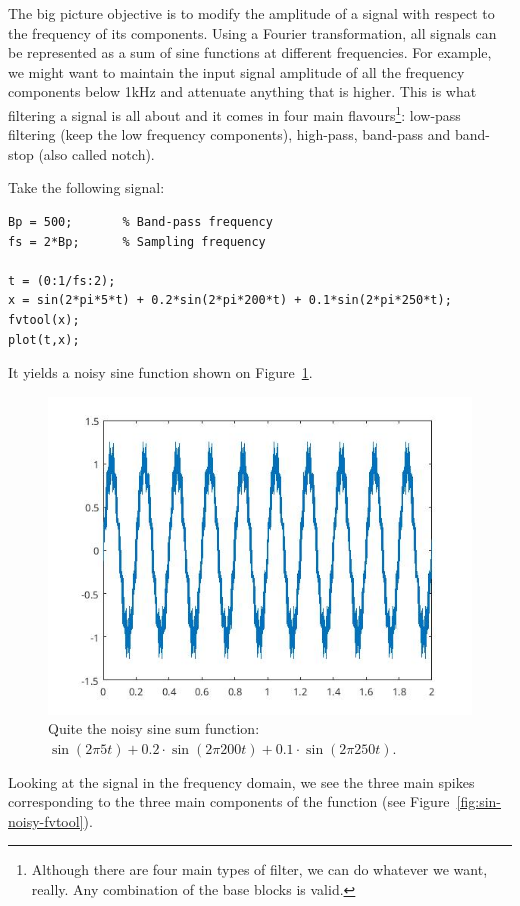 \documentclass{../template/labo}
\author{DLH}
\begin{document}

The big picture objective is to modify the amplitude of a signal with respect to the frequency of its components. Using a Fourier transformation, all signals can be represented as a sum of sine functions at different frequencies. 
For example, we might want to maintain the input signal amplitude of all the frequency components below 1kHz and attenuate anything that is higher.
This is what filtering a signal is all about and it comes in four main flavours\footnote{Although there are four main types of filter, we can do whatever we want, really. Any combination of the base blocks is valid.}: low-pass filtering (keep the low frequency components), high-pass, band-pass and band-stop (also called notch).

Take the following signal:
\begin{verbatim}
Bp = 500;       % Band-pass frequency
fs = 2*Bp;      % Sampling frequency

t = (0:1/fs:2);
x = sin(2*pi*5*t) + 0.2*sin(2*pi*200*t) + 0.1*sin(2*pi*250*t);
fvtool(x);
plot(t,x);
\end{verbatim}

It yields a noisy sine function shown on Figure~\ref{fig:sine-noisy}.

\begin{figure}[ht!]
\centering
\includegraphics[width=.6\textwidth]{sin-noisy.jpg}
\caption{Quite the noisy sine sum function: $\sin (2\pi 5t) + 0.2 \cdot \sin (2\pi 200t) +  0.1 \cdot \sin (2 \pi 250t)$.}
\label{fig:sine-noisy}
\end{figure}

Looking at the signal in the frequency domain, we see the three main spikes corresponding to the three main components of the function (see Figure~\ref{fig:sin-noisy-fvtool}).
\end{document}
